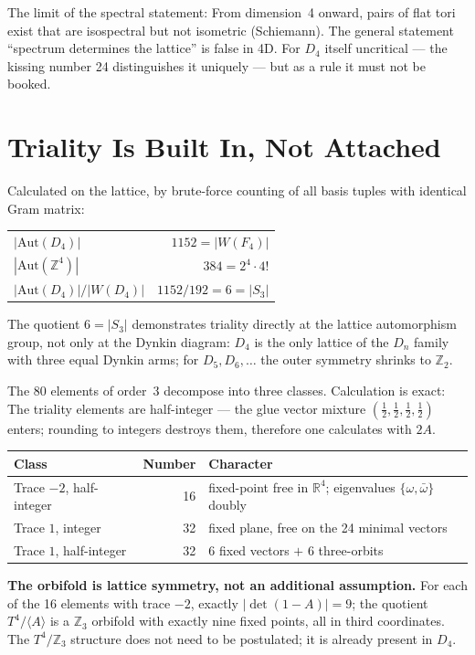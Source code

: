 The limit of the spectral statement: From dimension~4 onward, pairs of flat
tori exist that are isospectral but not isometric (Schiemann). The general statement
\enquote{spectrum determines the lattice} is false in 4D.
For $D_4$ itself uncritical --- the kissing number 24 distinguishes it uniquely
--- but as a rule it must not be booked.

\section{Triality Is Built In, Not Attached}

Calculated on the lattice, by brute-force counting of all basis tuples with
identical Gram matrix:
\begin{center}
\small
\begin{tabular}{lr}
\toprule
$|\mathrm{Aut}(D_4)|$ & $1152 = |W(F_4)|$ \\
$|\mathrm{Aut}(\mathbb{Z}^4)|$ & $384 = 2^4\cdot4!$ \\
$|\mathrm{Aut}(D_4)|/|W(D_4)|$ & $1152/192 = 6 = |S_3|$ \\
\bottomrule
\end{tabular}
\end{center}
The quotient $6 = |S_3|$ demonstrates triality directly at the
lattice automorphism group, not only at the Dynkin diagram: $D_4$ is
the only lattice of the $D_n$ family with three equal
Dynkin arms; for $D_5,D_6,\dots$ the outer symmetry shrinks to
$\mathbb{Z}_2$.

The 80 elements of order~3 decompose into three classes. Calculation is
exact: The triality elements are half-integer --- the glue vector mixture
$(\frac12,\frac12,\frac12,\frac12)$ enters; rounding to integers
destroys them, therefore one calculates with $2A$.
\begin{center}
\small
\begin{tabular}{lrp{4.5cm}}
\toprule
Class & Number & Character \\
\midrule
Trace $-2$, half-integer & 16 & fixed-point free in $\mathbb{R}^4$; eigenvalues $\{\omega,\bar\omega\}$ doubly \\
Trace $1$, integer & 32 & fixed plane, free on the 24 minimal vectors \\
Trace $1$, half-integer & 32 & 6 fixed vectors $+$ 6 three-orbits \\
\bottomrule
\end{tabular}
\end{center}

\textbf{The orbifold is lattice symmetry, not an additional assumption.} For
each of the 16 elements with trace $-2$, exactly $|\det(1-A)| = 9$; the
quotient $T^4/\langle A\rangle$ is a $\mathbb{Z}_3$ orbifold with exactly
nine fixed points, all in third coordinates. The $T^4/\mathbb{Z}_3$ structure
does not need to be postulated; it is already present in $D_4$.

